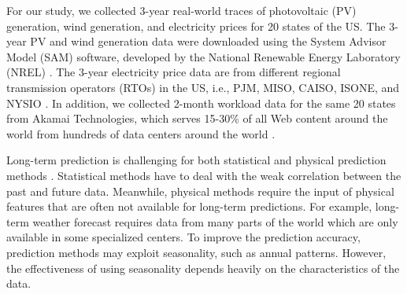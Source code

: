 For our study, we collected 3-year real-world traces of photovoltaic
(PV) generation, wind generation, and electricity prices for 20 states
of the US. The 3-year PV and wind generation data were downloaded
using the System Advisor Model (SAM) software, developed by the
National Renewable Energy Laboratory (NREL) \cite{nrel2010SAM}. The
3-year electricity price data are from different regional transmission
operators (RTOs) in the US, i.e., PJM, MISO, CAISO, ISONE, and NYSIO
\cite{qureshi2009cutting}. In addition, we collected 2-month workload
data for the same 20 states from Akamai Technologies, which serves
15-30\% of all Web content around the world from hundreds of data
centers around the world \cite{NygrenSS10}.


Long-term prediction is challenging for both statistical and physical
prediction methods \cite{lei2009review}. Statistical methods have to
deal with the weak correlation between the past and future
data. Meanwhile, physical methods require the input of physical
features that are often not available for long-term predictions. For
example, long-term weather forecast requires data from many parts of
the world which are only available in some specialized centers. %
To improve the prediction accuracy,
prediction methods may exploit seasonality, such as annual
patterns. However, the effectiveness of using seasonality depends
heavily on the characteristics of the data.


